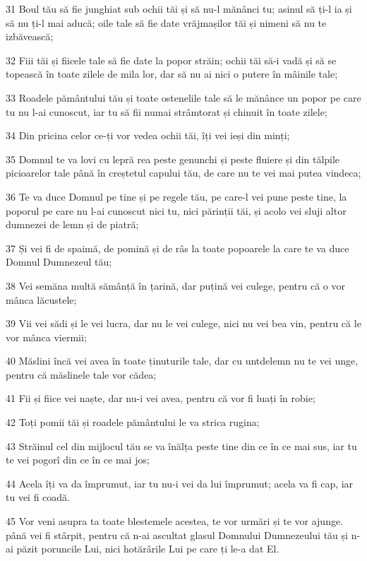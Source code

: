 \par 31 Boul tău să fie junghiat sub ochii tăi și să nu-l mănânci tu; asinul să ți-l ia și să nu ți-l mai aducă; oile tale să fie date vrăjmașilor tăi și nimeni să nu te izbăvească;
\par 32 Fiii tăi și fiicele tale să fie date la popor străin; ochii tăi să-i vadă și să se topească în toate zilele de mila lor, dar să nu ai nici o putere în mâinile tale;
\par 33 Roadele pământului tău și toate ostenelile tale să le mănânce un popor pe care tu nu l-ai cunoscut, iar tu să fii numai strâmtorat și chinuit în toate zilele;
\par 34 Din pricina celor ce-ți vor vedea ochii tăi, îți vei ieși din minți;
\par 35 Domnul te va lovi cu lepră rea peste genunchi și peste fluiere și din tălpile picioarelor tale până în creștetul capului tău, de care nu te vei mai putea vindeca;
\par 36 Te va duce Domnul pe tine și pe regele tău, pe care-l vei pune peste tine, la poporul pe care nu l-ai cunoscut nici tu, nici părinții tăi, și acolo vei sluji altor dumnezei de lemn și de piatră;
\par 37 Și vei fi de spaimă, de pomină și de râs la toate popoarele la care te va duce Domnul Dumnezeul tău;
\par 38 Vei semăna multă sămânță în țarină, dar puțină vei culege, pentru că o vor mânca lăcustele;
\par 39 Vii vei sădi și le vei lucra, dar nu le vei culege, nici nu vei bea vin, pentru că le vor mânca viermii;
\par 40 Măslini încă vei avea în toate ținuturile tale, dar cu untdelemn nu te vei unge, pentru că măslinele tale vor cădea;
\par 41 Fii și fiice vei naște, dar nu-i vei avea, pentru că vor fi luați în robie;
\par 42 Toți pomii tăi și roadele pământului le va strica rugina;
\par 43 Străinul cel din mijlocul tău se va înălța peste tine din ce în ce mai sus, iar tu te vei pogorî din ce în ce mai jos;
\par 44 Acela îți va da împrumut, iar tu nu-i vei da lui împrumut; acela va fi cap, iar tu vei fi coadă.
\par 45 Vor veni asupra ta toate blestemele acestea, te vor urmări și te vor ajunge. până vei fi stârpit, pentru că n-ai ascultat glasul Domnului Dumnezeului tău și n-ai păzit poruncile Lui, nici hotărârile Lui pe care ți le-a dat El.
